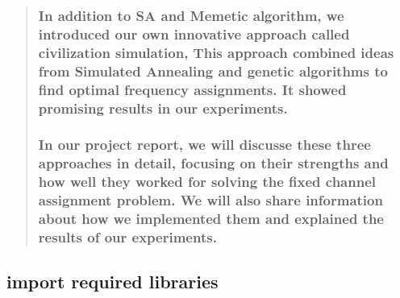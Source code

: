 \documentclass[11pt]{article}
\begin{document}
\begin{quote}
{\subsubsection{\texorpdfstring{ In addition to SA and Memetic algorithm,
we introduced our own innovative approach called civilization
simulation, This approach combined ideas from Simulated Annealing and
genetic algorithms to find optimal frequency assignments. It showed
promising results in our
experiments.}{  In addition to SA and Memetic algorithm, we introduced our own innovative approach called civilization simulation, This approach combined ideas from Simulated Annealing and genetic algorithms to find optimal frequency assignments. It showed promising results in our experiments.}}\label{in-addition-to-sa-and-memetic-algorithm-we-introduced-our-own-innovative-approach-called-civilization-simulation-this-approach-combined-ideas-from-simulated-annealing-and-genetic-algorithms-to-find-optimal-frequency-assignments.-it-showed-promising-results-in-our-experiments.}}

\hypertarget{in-our-project-report-we-will-discusse-these-three-approaches-in-detail-focusing-on-their-strengths-and-how-well-they-worked-for-solving-the-fixed-channel-assignment-problem.-we-will-also-share-information-about-how-we-implemented-them-and-explained-the-results-of-our-experiments.}{%
\subsubsection{\texorpdfstring{ In our project report, we will discusse
these three approaches in detail, focusing on their strengths and how
well they worked for solving the fixed channel assignment problem. We
will also share information about how we implemented them and explained
the results of our
experiments.}{  In our project report, we will discusse these three approaches in detail, focusing on their strengths and how well they worked for solving the fixed channel assignment problem. We will also share information about how we implemented them and explained the results of our experiments.}}\label{in-our-project-report-we-will-discusse-these-three-approaches-in-detail-focusing-on-their-strengths-and-how-well-they-worked-for-solving-the-fixed-channel-assignment-problem.-we-will-also-share-information-about-how-we-implemented-them-and-explained-the-results-of-our-experiments.}}
\end{quote}

    \hypertarget{import-required-libraries}{%
\subsection{\texorpdfstring{ import required
libraries}{  import required libraries}}\label{import-required-libraries}}
\end{document}
